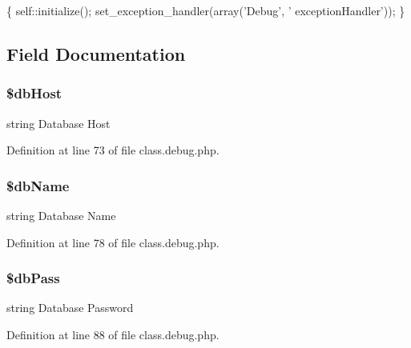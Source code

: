 \begin{DoxyCode}
                                            \{
                              self::initialize();
                              set\_exception\_handler(array(\textcolor{stringliteral}{'Debug'}, \textcolor{stringliteral}{'
      exceptionHandler'}));
               \}
\end{DoxyCode}


\subsection{Field Documentation}
\hypertarget{class_debug_ad0ddb2725e69c88a729e0cc242a1b2a6}{
\subsubsection[{\$db\-Host}]{\setlength{\rightskip}{0pt plus 5cm}\$db\-Host\hspace{0.3cm}{\ttfamily [static]}}}\label{class_debug_ad0ddb2725e69c88a729e0cc242a1b2a6}
string Database Host 

Definition at line 73 of file class.\-debug.\-php.

\hypertarget{class_debug_a68f39949e76b64662a06cb56579d91c3}{
\subsubsection[{\$db\-Name}]{\setlength{\rightskip}{0pt plus 5cm}\$db\-Name\hspace{0.3cm}{\ttfamily [static]}}}\label{class_debug_a68f39949e76b64662a06cb56579d91c3}
string Database Name 

Definition at line 78 of file class.\-debug.\-php.

\hypertarget{class_debug_a30d808caf55f524798c6a5aaafd633ad}{
\subsubsection[{\$db\-Pass}]{\setlength{\rightskip}{0pt plus 5cm}\$db\-Pass\hspace{0.3cm}{\ttfamily [static]}}}\label{class_debug_a30d808caf55f524798c6a5aaafd633ad}
string Database Password 

Definition at line 88 of file class.\-debug.\-php.

